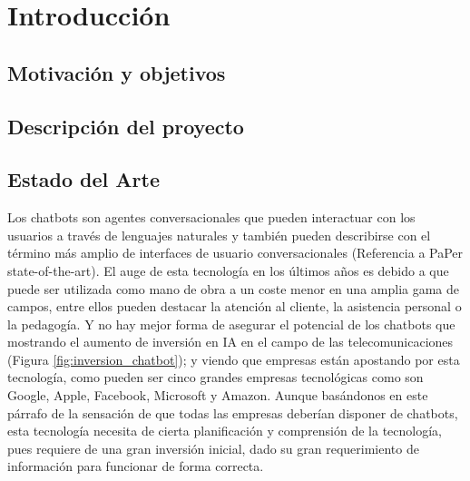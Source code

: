 \chapter{Introducción}

\section{Motivación y objetivos}



\section{Descripción del proyecto}



\section{Estado del Arte}

Los chatbots son agentes conversacionales que pueden interactuar con los usuarios a través de lenguajes naturales y también pueden describirse con el término más amplio de interfaces de usuario conversacionales (Referencia a PaPer state-of-the-art). El auge de esta tecnología en los últimos años es debido a que puede ser utilizada como mano de obra a un coste menor en una amplia gama de campos, entre ellos pueden destacar la atención al cliente, la asistencia personal o la pedagogía. Y no hay mejor forma de asegurar el potencial de los chatbots que mostrando el aumento de inversión en IA en el campo de las telecomunicaciones (Figura \ref{fig:inversion_chatbot}); y viendo que empresas están apostando por esta tecnología, como pueden ser cinco grandes empresas tecnológicas como son Google, Apple, Facebook, Microsoft y Amazon. Aunque basándonos en este párrafo de la sensación de que todas las empresas deberían disponer de chatbots, esta tecnología necesita de cierta planificación y comprensión de la tecnología, pues requiere de una gran inversión inicial, dado su gran requerimiento de información para funcionar de forma correcta.

